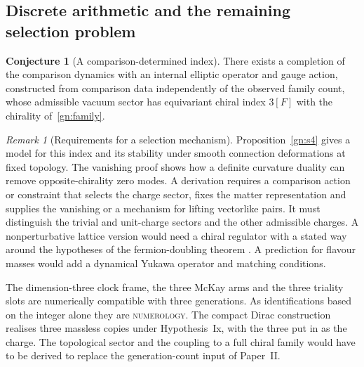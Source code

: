 \documentclass[aps,pra,onecolumn,superscriptaddress,nofootinbib,10pt]{revtex4-2}
\theoremstyle{definition}
\newtheorem{conjecture}[theorem]{Conjecture}
\theoremstyle{remark}
\newtheorem{remark}[theorem]{Remark}
\begin{document}
\subsection{Discrete arithmetic and the remaining selection problem}\label{gn:boundary}



\begin{conjecture}[A comparison-determined index]\label{gn:conjecture}
There exists a completion of the comparison dynamics with an
internal elliptic operator and gauge action, constructed from
comparison data independently of the observed family count,
whose admissible vacuum sector has equivariant chiral index
$3[F]$ with the chirality of~\eqref{gn:family}.
\end{conjecture}
\begin{remark}[Requirements for a selection mechanism]\label{gn:programme}
Proposition~\ref{gn:s4} gives a model for this index and its stability
under smooth connection deformations at fixed topology. The
vanishing proof shows how a definite curvature duality can remove
opposite-chirality zero modes. A derivation requires a comparison
action or constraint that selects the charge sector, fixes the
matter representation and supplies the vanishing or a mechanism for
lifting vectorlike pairs. It must distinguish the trivial and
unit-charge sectors and the other admissible charges. A
nonperturbative lattice version would need a chiral regulator
with a stated way around the hypotheses of the fermion-doubling
theorem \cite{gn:nn}. A prediction for flavour masses would
add a dynamical Yukawa operator and matching conditions.

The dimension-three clock frame, the three McKay arms and the
three triality slots are numerically compatible with three
generations. As identifications based on the integer alone they
are \textsc{numerology}. The compact Dirac construction realises
three massless copies under Hypothesis~Ix, with the three put in as the charge. The
topological sector and the coupling to a full chiral family
would have to be derived to replace the generation-count input of
Paper~II.
\end{remark}
\end{document}
